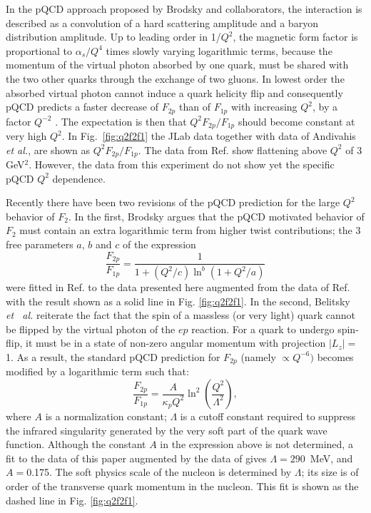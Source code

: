 In the pQCD approach proposed by Brodsky and collaborators\cite{brodsky,brodlep}, 
the interaction is described as a convolution 
of a hard scattering amplitude and a baryon distribution amplitude. Up to
leading order in 1/$Q^2$, the magnetic form factor is proportional to 
$\alpha_s/Q^4$ times slowly varying logarithmic terms, because the momentum of the virtual
photon absorbed by one quark, must be shared with the two other quarks through the exchange of
two gluons. In lowest order the absorbed virtual photon cannot induce a quark helicity flip and 
consequently pQCD predicts a faster decrease of $F_{2p}$ 
than of $F_{1p}$ with increasing $Q^2$, by a factor $Q^{-2}$ \cite{brodsky}. 
The expectation is then that $Q^2 F_{2p}/F_{1p}$ should
become constant at very high $Q^2$. 
In Fig.~\ref{fig:q2f2f1} the JLab data together with data of Andivahis {\it et al.}\cite{andivahisA,andivahisB},
are shown as $Q^2 F_{2p}/F_{1p}$. The data from Ref. \cite{andivahisA,andivahisB} show flattening 
above $Q^2$ of 3 GeV$^2$. However, the data from this experiment do not show yet the specific pQCD $Q^2$ dependence.

Recently there have been  two revisions of the pQCD prediction
for the large $Q^2$ behavior of $F_2$. In the first, Brodsky \cite{Brodsky:2002} argues 
that the pQCD motivated behavior of $F_2$ must contain an extra logarithmic 
term from higher twist contributions; the 3 free parameters $a$, $b$ and $c$ of the expression
\begin{equation}
\frac{F_{2p}}{F_{1p}}=\frac{1}{1+(Q^{2}/c)\ln^b(1+Q^{2}/a)}
\end{equation}
\noindent
were fitted in Ref. \cite{Brodsky:2002} to the data 
presented here augmented from the data of Ref. \cite{gayou:2002} with the result shown 
as a solid line in Fig. \ref{fig:q2f2f1}. In the second, Belitsky {\it {et~ al.}} \cite{belitsky:2002} 
reiterate the fact that the spin of a massless (or very light) quark 
cannot be flipped by the virtual photon of the $ep$ reaction. For a quark to 
undergo spin-flip, it must be in a state of non-zero angular momentum with projection $\mid L_z \mid = $1. 
As a result, the standard pQCD prediction for $F_{2p}$ (namely $\propto Q^{-6})$ 
becomes modified by a logarithmic term such that:
\begin{equation} 
\frac{F_{2p}}{F_{1p}}=\frac{A } {\kappa_{p} Q^2} \ln^2(\frac{Q^2}{\Lambda^2}),
\end{equation} 
\noindent
where $A$ is a 
normalization constant;    
$\Lambda$ is a cutoff constant required to suppress the infrared singularity
generated by the very soft part of the quark wave function. Although the
constant $A$ in the expression above is not determined, a fit to the data 
of this paper augmented by the data of \cite{gayou:2002} gives $\Lambda=290$~MeV, and
$A=$0.175. The soft physics scale of the nucleon is determined by $\Lambda$; its 
size is of order of the transverse quark momentum in the nucleon. 
This fit is shown as the dashed line in Fig. \ref{fig:q2f2f1}. 

